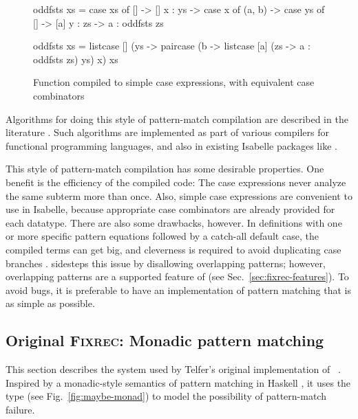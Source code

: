 \begin{figure}
\begin{hscode}
oddfsts xs = case xs of
               []     -> []
               x : ys -> case x of
                           (a, b) -> case ys of
                                       []     -> [a]
                                       y : zs -> a : oddfsts zs
\end{hscode}
\begin{hscode}
oddfsts xs =
  listcase [] (\x ys ->
    paircase (\a b ->
      listcase [a] (\y zs -> a : oddfsts zs) ys) x) xs
\end{hscode}
\caption{Function compiled to simple case expressions, with equivalent case combinators}
\label{fig:fixrec-example-case}
\end{figure}

Algorithms for doing this style of pattern-match compilation are described in the literature \cite{Wadler87efficient}. Such algorithms are implemented as part of various compilers for functional programming languages, and also in existing Isabelle packages like {\recdef} \cite{Slind96recdef}.

This style of pattern-match compilation has some desirable properties. One benefit is the efficiency of the compiled code: The case expressions never analyze the same subterm more than once. Also, simple case expressions are convenient to use in Isabelle, because appropriate case combinators are already provided for each datatype. There are also some drawbacks, however. In definitions with one or more specific pattern equations followed by a catch-all default case, the compiled terms can get big, and cleverness is required to avoid duplicating case branches \cite[\S 5.4.1]{Wadler87efficient}. {\recdef} sidesteps this issue by disallowing overlapping patterns; however, overlapping patterns are a supported feature of {\fixrec} (see Sec.~\ref{sec:fixrec-features}). To avoid bugs, it is preferable to have an implementation of pattern matching that is as simple as possible.

\subsection{Original \textsc{Fixrec}: Monadic pattern matching}

This section describes the system used by Telfer's original implementation of {\fixrec}~\cite{Telfer04}. Inspired by a monadic-style semantics of pattern matching in Haskell \cite{Harrison02finecontrol}, it uses the  type (see Fig.~\ref{fig:maybe-monad}) to model the possibility of pattern-match failure.

